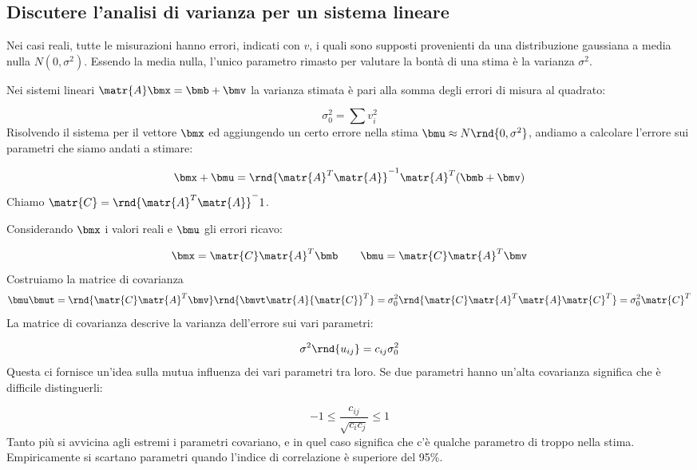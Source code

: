 \documentclass[\main/main.tex]{subfiles}
\begin{document}
\subsection{Discutere l'analisi di varianza per un sistema lineare}
Nei casi reali, tutte le misurazioni hanno errori, indicati con $v$, i quali sono supposti provenienti da una distribuzione gaussiana a media nulla $N(0, \sigma^2)$. Essendo la media nulla, l'unico parametro rimasto per valutare la bontà di una stima è la varianza $\sigma^2$.

Nei sistemi lineari $\matr{A}\bmx = \bmb + \bmv$ la varianza stimata è pari alla somma degli errori di misura al quadrato:

\[
  \sigma^2_0 = \sum v^2_i
\]
Risolvendo il sistema per il vettore $\bmx$ ed aggiungendo un certo errore nella stima $\bmu \approx N\rnd{0, \sigma^2}$, andiamo a calcolare l'errore sui parametri che siamo andati a stimare:

\[
  \bmx + \bmu = \rnd{\matr{A}^T\matr{A}}^{-1}\matr{A}^T(\bmb+\bmv)
\]
Chiamo $\matr{C} = \rnd{\matr{A}^T\matr{A}}^-1$.

Considerando $\bmx$ i valori reali e $\bmu$ gli errori ricavo:

\[
  \bmx = \matr{C}\matr{A}^T\bmb \qquad
  \bmu = \matr{C}\matr{A}^T\bmv
\]
Costruiamo la matrice di covarianza
\[
  \bmu\bmut = \rnd{\matr{C}\matr{A}^T\bmv}\rnd{\bmvt\matr{A}{\matr{C}}^T}
  = \sigma^2_0 \rnd{\matr{C}\matr{A}^T\matr{A}\matr{C}^T} = \sigma^2_0\matr{C}^T
\]
La matrice di covarianza descrive la varianza dell'errore sui vari parametri:

\[
  \sigma^2\rnd{u_{ij}} = c_{ij}\sigma^2_0
\]
Questa ci fornisce un'idea sulla mutua influenza dei vari parametri tra loro. Se due parametri hanno un'alta covarianza significa che è difficile distinguerli:

\[
  -1 \leq \frac{c_{ij}}{\sqrt{c_ic_j}} \leq 1
\]
Tanto più si avvicina agli estremi i parametri covariano, e in quel caso significa che c'è qualche parametro di troppo nella stima. Empiricamente si scartano parametri quando l'indice di correlazione è superiore del 95\%.
\end{document}
